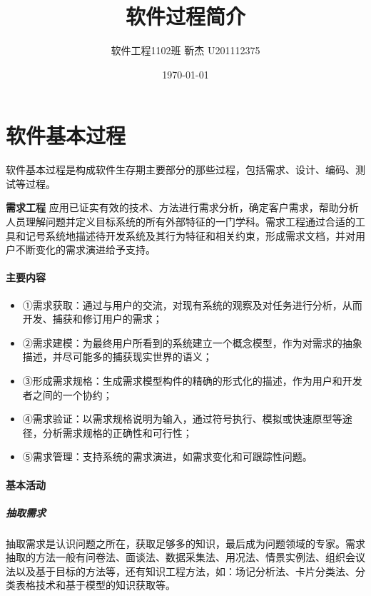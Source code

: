 \documentclass[UTF8,nofonts]{ctexart}
\title{\Huge 软件过程简介}
\author{\large	
  软件工程1102班  靳杰 U201112375}
\date{\Large\today}
\makeatletter
\renewcommand{\section}{\@startsection{section}{1}{0mm}
  {-\baselineskip}{0.5\baselineskip}{\fontsize{16pt}{16pt}\bf\leftline}}
\makeatother
\begin{document}
\maketitle
\onecolumn{
\tableofcontents}
\newpage
\part{\textbf{软件基本过程}}
软件基本过程是构成软件生存期主要部分的那些过程，包括需求、设计、编码、测试等过程。
\section{\textbf{需求工程}}
应用已证实有效的技术、方法进行需求分析，确定客户需求，帮助分析人员理解问题并定义目标系统的所有外部特征的一门学科。需求工程通过合适的工具和记号系统地描述待开发系统及其行为特征和相关约束，形成需求文档，并对用户不断变化的需求演进给予支持。
\subsection{\textbf{主要内容}}
\begin{itemize}
 \setlength{\itemsep}{0pt}
 \setlength{\parskip}{0pt}
 \setlength{\parsep}{0pt}
\item ①需求获取：通过与用户的交流，对现有系统的观察及对任务进行分析，从而开发、捕获和修订用户的需求；
\item ②需求建模：为最终用户所看到的系统建立一个概念模型，作为对需求的抽象描述，并尽可能多的捕获现实世界的语义；
\item ③形成需求规格：生成需求模型构件的精确的形式化的描述，作为用户和开发者之间的一个协约；
\item ④需求验证：以需求规格说明为输入，通过符号执行、模拟或快速原型等途径，分析需求规格的正确性和可行性；
\item ⑤需求管理：支持系统的需求演进，如需求变化和可跟踪性问题。
\end{itemize}
\subsection{\textbf{基本活动}}
\subsubsection{\textbf{抽取需求}}
抽取需求是认识问题之所在，获取足够多的知识，最后成为问题领域的专家。需求抽取的方法一般有问卷法、面谈法、数据采集法、用况法、情景实例法、组织会议法以及基于目标的方法等，还有知识工程方法，如：场记分析法、卡片分类法、分类表格技术和基于模型的知识获取等。
\end{document}
